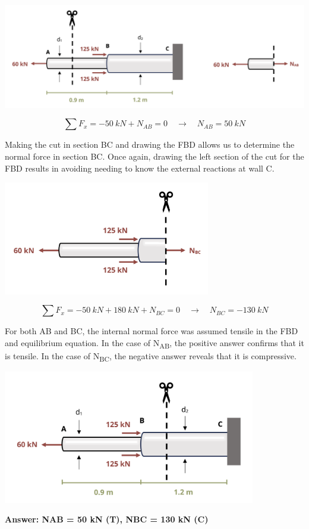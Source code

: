 \documentclass[
  letterpaper,
  DIV=11,
  numbers=noendperiod]{scrreprt}
\theoremstyle{definition}
\theoremstyle{remark}
\begin{document}
\begin{tcolorbox}
\begin{tcolorbox}
\begin{center}
\includegraphics{images/CH1 PNGs/example 1.5 part 2.png}
\end{center}

\[
\sum F_x=-50{~kN}+N_{AB}=0 \quad\rightarrow\quad N_{AB}=50{~kN}
\]

Making the cut in section BC and drawing the FBD allows us to determine
the normal force in section BC. Once again, drawing the left section of
the cut for the FBD results in avoiding needing to know the external
reactions at wall C.

\begin{center}
\includegraphics[width=3.5625in,height=\textheight]{images/CH1 PNGs/example 1.5 part 3.png}
\end{center}

\[
\sum F_x=-50{~kN}+180{~kN}+N_{BC}=0 \quad\rightarrow\quad N_{BC}=-130{~kN}
\]

For both AB and BC, the internal normal force was assumed tensile in the
FBD and equilibrium equation. In the case of N\textsubscript{AB}, the
positive answer confirms that it is tensile. In the case of
N\textsubscript{BC}, the negative answer reveals that it is compressive.

\begin{center}
\includegraphics[width=4.34375in,height=\textheight]{images/CH1 PNGs/example 1.5 part 4.png}
\end{center}

\textbf{Answer: NAB = 50 kN (T), NBC = 130 kN (C)}

\end{tcolorbox}

\end{tcolorbox}
\end{document}
